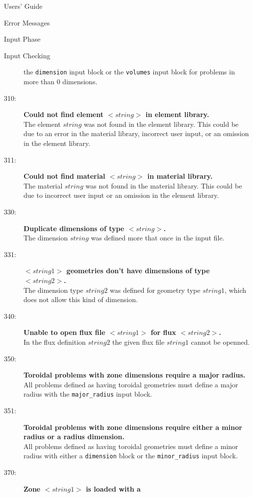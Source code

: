 \begin{chapter}{Users' Guide\label{app:user.guide}}
\begin{section}{Error Messages}
\begin{subsection}{Input Phase}
\begin{subsubsection}{Input Checking}
\begin{description}
          the \texttt{dimension} input block or the \texttt{volumes}
          input block for problems in more than 0 dimensions.
        \item[310:]\textbf{Could not find element $<\!\!string\!\!>$
            in element library.}\ \\
          The element $string$ was not found in the element library.
          This could be due to an error in the material library,
          incorrect user input, or an omission in the element
          library.
        \item[311:]\textbf{Could not find material
            $<\!\!string\!\!>$ in material library.}\ \\
          The material $string$ was not found in the material
          library.  This could be due to incorrect user input or an
          omission in the element library.
        \item[330:]\textbf{Duplicate dimensions of type
            $<\!\!string\!\!>$.}\ \\
          The dimension $string$ was defined more that once in the
          input file.
        \item[331:]\textbf{$<\!\!string1\!\!>$ geometries don't have
            dimensions of type $<\!\!string2\!\!>$.}\ \\
          The dimension type $string2$ was defined for geometry type
          $string1$, which does not allow this kind of dimension.
        \item[340:]\textbf{Unable to open flux file
            $<\!\!string1\!\!>$ for flux $<\!\!string2\!\!>$.}\ \\
          In the flux definition $string2$ the given flux file
          $string1$ cannot be openned.
        \item[350:]\textbf{Toroidal problems with zone dimensions
            require a major radius.}\ \\
          All problems defined as having toroidal geometries must
          define a major radius with the \texttt{major\_radius} input
          block.
        \item[351:]\textbf{Toroidal problems with zone dimensions
            require either a minor radius or a radius dimension.}\ \\
          All problems defined as having toroidal geometries must
          define a minor radius with either a \texttt{dimension} block
          or the \texttt{minor\_radius} input block.
        \item[370:]\textbf{Zone $<\!\!string1\!\!>$ is loaded with a
}
\end{description}
\end{subsubsection}
\end{subsection}
\end{section}
\end{chapter}
